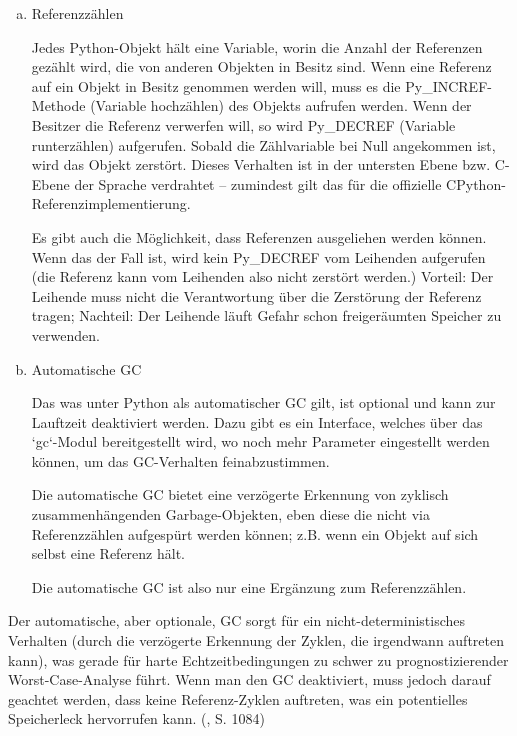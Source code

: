 \begin{enumerate}[(a)]

  \item Referenzzählen

        Jedes Python-Objekt hält eine Variable, worin die Anzahl der
        Referenzen gezählt wird, die von anderen Objekten in Besitz sind.
        Wenn eine Referenz auf ein Objekt in Besitz genommen werden will,
        muss es die Py\_INCREF-Methode (Variable hochzählen) des Objekts
        aufrufen werden. Wenn der Besitzer die Referenz verwerfen will, so
        wird Py\_DECREF (Variable runterzählen) aufgerufen. Sobald die
        Zählvariable bei Null angekommen ist, wird das Objekt zerstört.
        Dieses Verhalten ist in der untersten Ebene bzw. C-Ebene der Sprache
        verdrahtet -- zumindest gilt das für die offizielle
        CPython-Referenzimplementierung.

        Es gibt auch die Möglichkeit, dass Referenzen ausgeliehen werden
        können. Wenn das der Fall ist, wird kein Py\_DECREF vom Leihenden
        aufgerufen (die Referenz kann vom Leihenden also nicht zerstört
        werden.) Vorteil: Der Leihende muss nicht die Verantwortung über die
        Zerstörung der Referenz tragen; Nachteil: Der Leihende läuft Gefahr
        schon freigeräumten Speicher zu verwenden.

  \item Automatische GC

        Das was unter Python als automatischer GC gilt, ist optional und
        kann zur Lauftzeit deaktiviert werden. Dazu gibt es ein Interface,
        welches über das `gc`-Modul bereitgestellt wird, wo noch mehr
        Parameter eingestellt werden können, um das GC-Verhalten
        feinabzustimmen.

        Die automatische GC bietet eine verzögerte Erkennung von zyklisch
        zusammenhängenden Garbage-Objekten, eben diese die nicht via
        Referenzzählen aufgespürt werden können; z.B. wenn ein Objekt auf
        sich selbst eine Referenz hält.

        Die automatische GC ist also nur eine Ergänzung zum Referenzzählen.

\end{enumerate}


Der automatische, aber optionale, GC sorgt für ein nicht-deterministisches
Verhalten (durch die verzögerte Erkennung der Zyklen, die irgendwann
auftreten kann), was gerade für harte Echtzeitbedingungen zu schwer zu
prognostizierender Worst-Case-Analyse führt. Wenn man den GC deaktiviert,
muss jedoch darauf geachtet werden, dass keine Referenz-Zyklen auftreten,
was ein potentielles Speicherleck hervorrufen kann. (\cite{pyref-library}, S. 1084)

